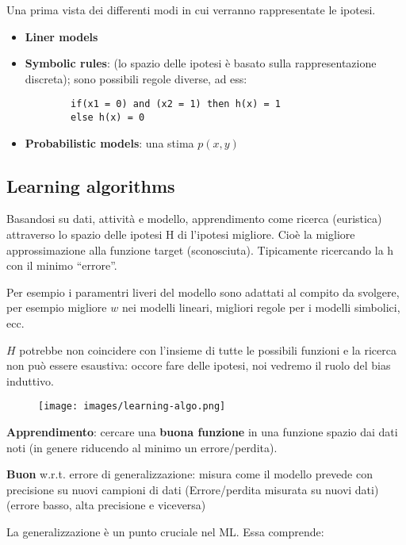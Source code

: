 Una prima vista dei differenti modi in cui verranno rappresentate le ipotesi.
\begin{itemize}
    \item \textbf{Liner models}
    \item \textbf{Symbolic rules}: (lo spazio delle ipotesi è basato sulla rappresentazione discreta); sono possibili regole diverse, ad ess:
    \begin{lstlisting}
        if(x1 = 0) and (x2 = 1) then h(x) = 1
        else h(x) = 0
    \end{lstlisting}
    \item \textbf{Probabilistic models}: una stima $p(x,y)$
\end{itemize}

\subsection{Learning algorithms}
Basandosi su dati, attività e modello, apprendimento come ricerca (euristica) attraverso lo spazio delle ipotesi H di l'ipotesi migliore.
Cioè la migliore approssimazione alla funzione target (sconosciuta). Tipicamente ricercando la h con il minimo “errore”.
\begin{example}
    Per esempio i paramentri liveri del modello sono adattati al compito da svolgere, per esempio
    migliore $w$ nei modelli lineari, migliori regole per i modelli simbolici, ecc.
\end{example}
\hspace{-15pt}$H$ potrebbe non coincidere con l'insieme di tutte le possibili funzioni e la ricerca
non può essere esaustiva: occore fare delle ipotesi, noi vedremo il ruolo del bias induttivo.
\begin{figure}[h!]
    \centering
    \texttt{[image: images/learning-algo.png]}
\end{figure}
\hspace{-15pt}\textbf{Apprendimento}: cercare una \textbf{buona funzione} in una funzione
spazio dai dati noti (in genere riducendo al minimo un errore/perdita).
\begin{definition}
    \textbf{Buon} w.r.t. errore di generalizzazione: misura come
    il modello prevede con precisione su nuovi campioni di dati
    (Errore/perdita misurata su nuovi dati) (errore basso, alta precisione e viceversa)
\end{definition}
\hspace{-15pt}La generalizzazione è un punto cruciale nel ML. Essa comprende:
